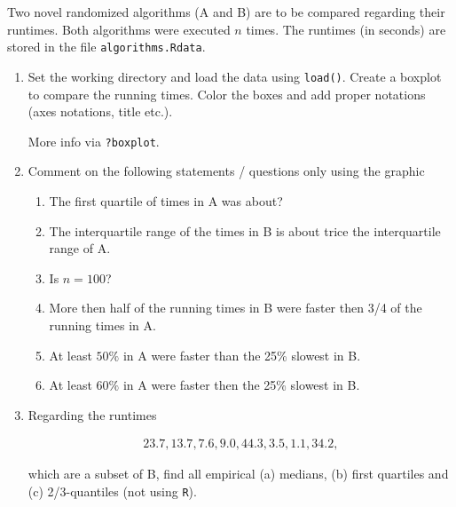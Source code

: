 
\begin{exercise}

Two novel randomized algorithms (A and B) are to be compared regarding
their runtimes. Both algorithms were executed $n$ times.
The runtimes (in seconds) are stored in the file \texttt{algorithms.Rdata}.

\begin{enumerate}[label = (\alph*)]
    \item Set the working directory and load the data using \texttt{load()}.
    Create a boxplot to compare the running times. Color the boxes and
    add proper notations (axes notations, title etc.).

    More info via \texttt{?boxplot}.

    \item Comment on the following statements / questions only using the
    graphic

    \begin{enumerate}[label = (\alph*)]
        \item The first quartile of times in A was about?
        \item The interquartile range of the times in B is about trice the interquartile range of A.
        \item Is $n = 100$?
        \item More then half of the running times in B were faster then 3/4 of the running times in A.
        \item At least $50\%$ in A were faster than the 25\% slowest in B.
        \item At least $60\%$ in A were faster then the 25\% slowest in B.
    \end{enumerate}

    \item Regarding the runtimes
    
    \begin{align*}
        23.7, 13.7, 7.6, 9.0, 44.3, 3.5, 1.1, 34.2,
    \end{align*}

    which are a subset of B, find all empirical (a) medians, (b)
    first quartiles and (c) 2/3-quantiles (not using \texttt{R}).
\end{enumerate}

\end{exercise}

